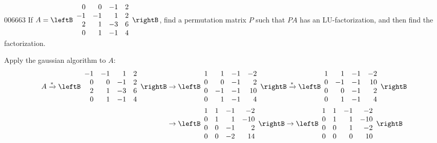 \begin{example}{}{006663}
If $A = \leftB \begin{array}{rrrr}
0 & 0 & -1 & 2 \\
-1 & -1 & 1 & 2 \\
2 & 1 & -3 & 6 \\
0 & 1 & -1 & 4
\end{array} \rightB$, find a permutation matrix $P$ such that $PA$ has an LU-factorization, and then find the factorization.

\begin{solution}
  Apply the gaussian algorithm to $A$:
\begin{align*}
A \xrightarrow{*} \leftB \begin{array}{rrrr}
-1 & -1 & 1 & 2 \\
0 & 0 & -1 & 2 \\
2 & 1 & -3 & 6 \\
0 & 1 & -1 & 4
\end{array} \rightB &\rightarrow \leftB \begin{array}{rrrr}
1 & 1 & -1 & -2 \\
0 & 0 & -1 & 2 \\
0 & -1 & -1 & 10 \\
0 & 1 & -1 & 4
\end{array} \rightB \xrightarrow{*} \leftB \begin{array}{rrrr}
1 & 1 & -1 & -2 \\
0 & -1 & -1 & 10 \\
0 & 0 & -1 & 2 \\
0 & 1 & -1 & 4
\end{array} \rightB \\
&\rightarrow \leftB \begin{array}{rrrr}
1 & 1 & -1 & -2 \\
0 & 1 & 1 & -10 \\
0 & 0 & -1 & 2 \\
0 & 0 & -2 & 14
\end{array} \rightB \rightarrow \leftB \begin{array}{rrrr}
1 & 1 & -1 & -2 \\
0 & 1 & 1 & -10 \\
0 & 0 & 1 & -2 \\
0 & 0 & 0 & 10
\end{array} \rightB
\end{align*}


\end{solution}
\end{example}
